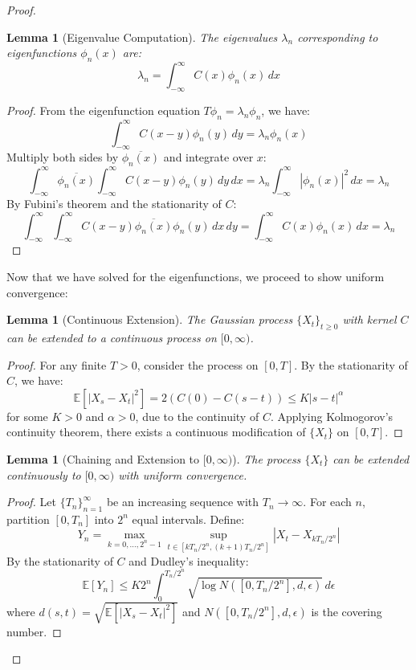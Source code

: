 \documentclass{article}
\newtheorem{lemma}[theorem]{Lemma}
\begin{document}
\begin{proof}
\begin{lemma}[Eigenvalue Computation]
The eigenvalues $\lambda_n$ corresponding to eigenfunctions $\phi_n(x)$ are:
\[
\lambda_n = \int_{-\infty}^\infty C(x) \phi_n(x) \, dx
\]
\end{lemma}

\begin{proof}
From the eigenfunction equation $T\phi_n = \lambda_n \phi_n$, we have:
\[
\int_{-\infty}^{\infty} C(x-y) \phi_n(y) \, dy = \lambda_n \phi_n(x)
\]
Multiply both sides by $\overline{\phi_n(x)}$ and integrate over $x$:
\[
\int_{-\infty}^{\infty} \overline{\phi_n(x)} \int_{-\infty}^{\infty} C(x-y) \phi_n(y) \, dy \, dx = \lambda_n \int_{-\infty}^{\infty} |\phi_n(x)|^2 \, dx = \lambda_n
\]
By Fubini's theorem and the stationarity of $C$:
\[
\int_{-\infty}^{\infty} \int_{-\infty}^{\infty} C(x-y) \overline{\phi_n(x)} \phi_n(y) \, dx \, dy = \int_{-\infty}^{\infty} C(x) \phi_n(x) \, dx = \lambda_n
\]
\end{proof}

Now that we have solved for the eigenfunctions, we proceed to show uniform convergence:

\begin{lemma}[Continuous Extension]
The Gaussian process $\{X_t\}_{t \geq 0}$ with kernel $C$ can be extended to a continuous process on $[0,\infty)$.
\end{lemma}

\begin{proof}
For any finite $T > 0$, consider the process on $[0,T]$. By the stationarity of $C$, we have:
\[
\mathbb{E}[|X_s - X_t|^2] = 2(C(0) - C(s-t)) \leq K|s-t|^\alpha
\]
for some $K > 0$ and $\alpha > 0$, due to the continuity of $C$. Applying Kolmogorov's continuity theorem, there exists a continuous modification of $\{X_t\}$ on $[0,T]$.
\end{proof}

\begin{lemma}[Chaining and Extension to $[0,\infty)$]
The process $\{X_t\}$ can be extended continuously to $[0,\infty)$ with uniform convergence.
\end{lemma}

\begin{proof}
Let $\{T_n\}_{n=1}^\infty$ be an increasing sequence with $T_n \to \infty$. For each $n$, partition $[0,T_n]$ into $2^n$ equal intervals. Define:
\[
Y_n = \max_{k=0,\ldots,2^n-1} \sup_{t \in [kT_n/2^n, (k+1)T_n/2^n]} |X_t - X_{kT_n/2^n}|
\]
By the stationarity of $C$ and Dudley's inequality:
\[
\mathbb{E}[Y_n] \leq K 2^n \int_0^{T_n/2^n} \sqrt{\log N([0,T_n/2^n], d, \epsilon)} \, d\epsilon
\]
where $d(s,t) = \sqrt{\mathbb{E}[|X_s - X_t|^2]}$ and $N([0,T_n/2^n], d, \epsilon)$ is the covering number.


\end{proof}
\end{proof}
\end{document}
